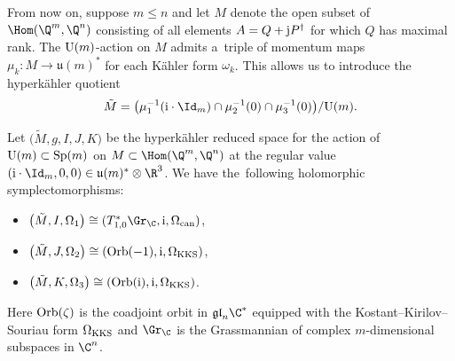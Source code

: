 From now on, suppose $m\le n$ and let $M$ denote the open subset of $\Hom(\Q^m,\Q^n)$ consisting of all elements $A=Q+{\rm j}P^\dagger$ for which $Q$ has maximal rank. The ${\rm U}(m)$-action on $M$ admits a~triple of momentum maps $\mu_k\colon M\rightarrow\mathfrak{u}(m)^*$ for each K\"{a}hler form $\omega_k$. This allows us to introduce the hyperk\"{a}hler quotient
\[
\tilde{M}=\bigl(\mu_1^{-1}({\rm i}\cdot\Id_m)\cap\mu_2^{-1}(0)\cap\mu_3^{-1}(0)\bigr)/{\rm U}(m).
\]
\begin{Theorem}\label{HK_red_thm}
	Let $\bigl(\tilde{M},g,I,J,K\bigr)$ be the hyperk\"{a}hler reduced space for the action of ${\rm U}(m)\subset {\rm Sp}(m)$ on $M\subset\Hom(\Q^m,\Q^n)$ at the regular value $({\rm i}\cdot\Id_m,0,0)\in\mathfrak{u}(m)^*\otimes\R^3$. We have the~following holomorphic symplectomorphisms:
	\begin{itemize}\itemsep=0pt
		\item $\bigl(\tilde{M}, I, \Omega_1\bigr)\cong (T^*_{1,0}\Gr_\C, {\rm i}, \Omega_{\rm can})$,
		\item $\bigl(\tilde{M},J,\Omega_2\bigr)\cong({\rm Orb}(-1), {\rm i}, \Omega_{\rm KKS})$,
		\item $\bigl(\tilde{M},K,\Omega_3\bigr)\cong({\rm Orb}({\rm i}), {\rm i}, \Omega_{\rm KKS})$.
	\end{itemize}
	Here ${\rm Orb}(\zeta)$ is the coadjoint orbit in $\mathfrak{gl}_n\C^*$ equipped with the Kostant--Kirilov--Souriau form $\Omega_{\rm KKS}$ and $\Gr_\C$ is the Grassmannian of complex $m$-dimensional subspaces in $\C^n$.
\end{Theorem}

